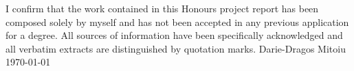 I confirm that the work contained in this Honours project report has
been composed solely by myself and has not been accepted in any
previous application for a degree. All sources of information have been
specifically acknowledged and all verbatim extracts are distinguished
by quotation marks.
\newline
\newline
\newline
Darie-Dragos Mitoiu
\newline
\today
